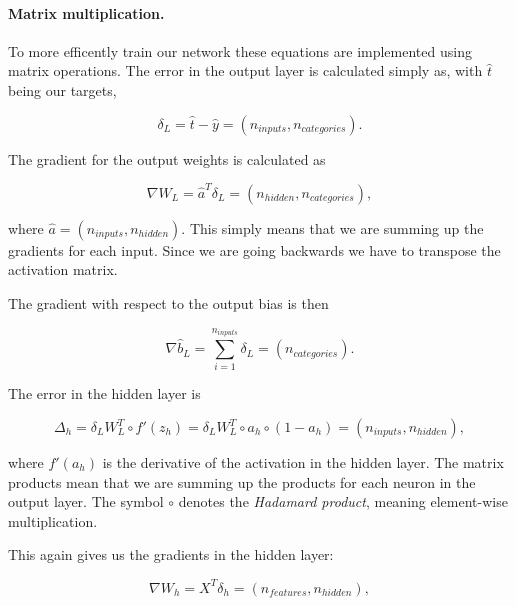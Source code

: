 \paragraph{Matrix  multiplication.}
To more efficently train our network these equations are implemented using matrix operations.  
The error in the output layer is calculated simply as, with $\hat{t}$ being our targets,  

$$ \delta_L = \hat{t} - \hat{y} = (n_{inputs}, n_{categories}) .$$  

The gradient for the output weights is calculated as  

$$ \nabla W_{L} = \hat{a}^T \delta_L   = (n_{hidden}, n_{categories}) ,$$

where $\hat{a} = (n_{inputs}, n_{hidden})$. This simply means that we are summing up the gradients for each input.  
Since we are going backwards we have to transpose the activation matrix.  

The gradient with respect to the output bias is then  

$$ \nabla \hat{b}_{L} = \sum_{i=1}^{n_{inputs}} \delta_L = (n_{categories}) .$$  

The error in the hidden layer is  

$$ \Delta_h = \delta_L W_{L}^T \circ f'(z_{h}) = \delta_L W_{L}^T \circ a_{h} \circ (1 - a_{h}) = (n_{inputs}, n_{hidden}) ,$$  

where $f'(a_{h})$ is the derivative of the activation in the hidden layer. The matrix products mean
that we are summing up the products for each neuron in the output layer. The symbol $\circ$ denotes
the \emph{Hadamard product}, meaning element-wise multiplication.  

This again gives us the gradients in the hidden layer:  

$$ \nabla W_{h} = X^T \delta_h = (n_{features}, n_{hidden}) ,$$  

